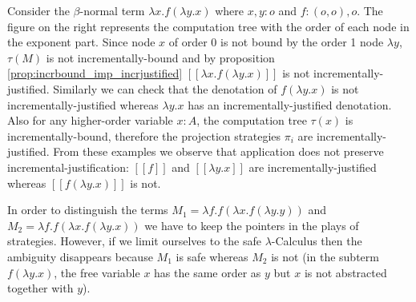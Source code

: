 \documentclass{llncs}
\newcommand{\lsem}{[\![} %
\newcommand{\rsem}{]\!]} %
\newcommand{\sem}[1]{{\lsem #1 \rsem}}
\begin{document}

\begin{example}
Consider the $\beta$-normal term $\lambda
x . f (\lambda y .x)$ where $x,y:o$ and $f:(o,o),o$. The figure on
the right represents the computation tree with the order of each
node in the exponent part. Since node $x$ of order $0$ is not bound
by the order 1 node $\lambda y$, $\tau(M)$ is not
incrementally-bound and by proposition
\ref{prop:incrbound_imp_incrjustified} $\sem{\lambda x . f (\lambda
y .x)}$ is not incrementally-justified. Similarly we can check that
the denotation of $f (\lambda y .x)$ is not incrementally-justified
whereas $\lambda y. x$ has an incrementally-justified denotation.
Also for any higher-order variable $x:A$, the computation tree
$\tau(x)$ is incrementally-bound, therefore the projection
strategies $\pi_i$ are incrementally-justified. From these examples
we observe that application does not preserve
incremental-justification: $\sem{f}$ and $\sem{\lambda y. x}$ are
incrementally-justified whereas $\sem{f (\lambda y .x)}$ is not.
\end{example}

\begin{example}
In order to distinguish the terms $M_1 = \lambda f . f
(\lambda x . f (\lambda y .y ))$ and $M_2 = \lambda f . f (\lambda x
. f (\lambda y .x ))$ we have to keep the pointers in the plays of
strategies. However, if we limit ourselves to the safe
$\lambda$-Calculus then the ambiguity disappears because $M_1$ is
safe whereas $M_2$ is not (in the subterm $f (\lambda y . x)$, the
free variable $x$ has the same order as $y$ but $x$ is not
abstracted together with $y$).
\end{example}
\end{document}
